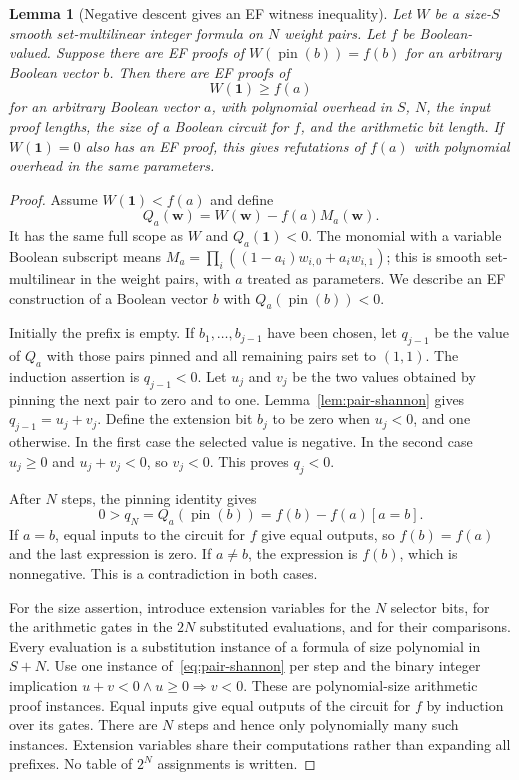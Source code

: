 \documentclass[11pt]{article}
\newtheorem{lemma}[theorem]{Lemma}
\theoremstyle{definition}
\theoremstyle{remark}
\begin{document}
\begin{lemma}[Negative descent gives an EF witness inequality]
\label{lem:ef-negative-descent}
Let $W$ be a size-$S$ smooth set-multilinear integer formula on $N$
weight pairs. Let $f$ be Boolean-valued. Suppose there are EF proofs
of $W(\operatorname{pin}(b))=f(b)$ for an arbitrary Boolean vector
$b$. Then there are EF proofs of
\[
 W(\mathbf1)\ge f(a)
\]
for an arbitrary Boolean vector $a$, with polynomial overhead
in $S$, $N$, the input proof lengths, the
size of a Boolean circuit for $f$, and the arithmetic bit length.
If $W(\mathbf1)=0$ also has an EF proof, this gives refutations of $f(a)$
with polynomial overhead in the same parameters.
\end{lemma}
\begin{proof}
Assume $W(\mathbf1)<f(a)$ and define
\[
 Q_a(\mathbf w)=W(\mathbf w)-f(a)M_a(\mathbf w).
\]
It has the same full scope as $W$ and $Q_a(\mathbf1)<0$.
The monomial with a variable Boolean subscript means
$M_a=\prod_i((1-a_i)w_{i,0}+a_iw_{i,1})$; this is smooth
set-multilinear in the weight pairs, with $a$ treated as parameters.
We describe an EF construction of a Boolean vector $b$ with
$Q_a(\operatorname{pin}(b))<0$.

Initially the prefix is empty. If $b_1,\ldots,b_{j-1}$ have been
chosen, let $q_{j-1}$ be the value of $Q_a$ with those pairs pinned
and all remaining pairs set to $(1,1)$. The induction assertion is
$q_{j-1}<0$. Let $u_j$ and $v_j$ be the two values obtained by
pinning the next pair to zero and to one. Lemma~\ref{lem:pair-shannon}
gives $q_{j-1}=u_j+v_j$. Define the extension bit $b_j$ to be zero
when $u_j<0$, and one otherwise. In the first case the selected
value is negative. In the second case $u_j\ge0$ and
$u_j+v_j<0$, so $v_j<0$. This proves $q_j<0$.

After $N$ steps, the pinning identity gives
\[
 0>q_N=Q_a(\operatorname{pin}(b))=f(b)-f(a)[a=b].
\]
If $a=b$, equal inputs to the circuit for $f$ give equal outputs,
so $f(b)=f(a)$ and the last expression is zero. If $a\ne b$,
the expression is $f(b)$, which is nonnegative. This is a
contradiction in both cases.

For the size assertion, introduce extension variables for the $N$
selector bits, for the arithmetic gates in the $2N$ substituted
evaluations, and for their comparisons. Every evaluation is a
substitution instance of a formula of size polynomial in $S+N$.
Use one instance of~\eqref{eq:pair-shannon} per step and the
binary integer implication
$u+v<0\wedge u\ge0\Rightarrow v<0$.
These are polynomial-size arithmetic proof instances. Equal inputs
give equal outputs of the circuit for $f$ by induction over its
gates. There are $N$ steps and hence only polynomially many such
instances. Extension variables share their computations rather than
expanding all prefixes. No table of $2^N$ assignments is written.
\end{proof}
\end{document}
